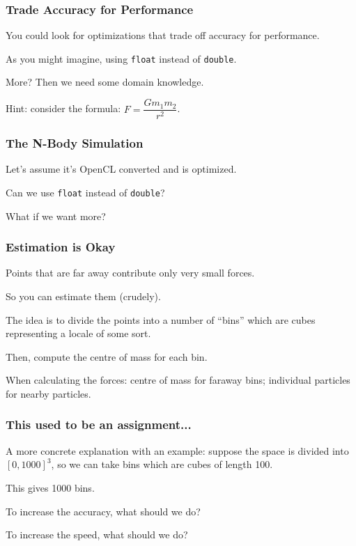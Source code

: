 \begin{frame}
\frametitle{Trade Accuracy for Performance}

You could look for optimizations that trade off accuracy for performance. 

As you might imagine, using \texttt{float} instead of \texttt{double}.


More? Then we need some domain knowledge. 

Hint: consider the formula: $F = \dfrac{Gm_{1}m_{2}}{r^{2}}$. 

\end{frame}



\begin{frame}
\frametitle{The N-Body Simulation}

Let's assume it's OpenCL converted and is optimized.

Can we use \texttt{float} instead of \texttt{double}?

What if we want more?

\end{frame}


\begin{frame}
\frametitle{Estimation is Okay}

Points that are far away contribute only very small forces. 

So you can estimate them (crudely). 

The idea is to divide the points into a number of ``bins'' which are cubes representing a locale of some sort. 

Then, compute the centre of mass for each bin. 

When calculating the forces: centre of mass for faraway bins; individual particles for nearby particles.


\end{frame}

\begin{frame}
\frametitle{This used to be an assignment... }

A more concrete explanation with an example: suppose the space  is divided into $[0, 1000]^3$, so we can take bins which are cubes of length 100. 

This gives 1000 bins. 

To increase the accuracy, what should we do?

To increase the speed, what should we do?

\end{frame}


